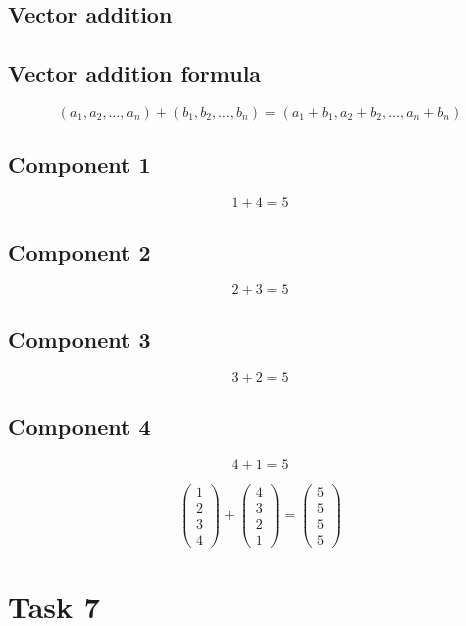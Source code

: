 \documentclass{article}
\begin{document}
\subsection*{Vector addition}
\subsection*{ \vspace{1em} Vector addition formula}
\[
(a_1, a_2, \dots, a_n) + (b_1, b_2, \dots, b_n) = (a_1 + b_1, a_2 + b_2, \dots, a_n + b_n)
\]
\subsection*{ \vspace{1em} Component 1}
\[
1 + 4 = 5
\]
\subsection*{ \vspace{1em} Component 2}
\[
2 + 3 = 5
\]
\subsection*{ \vspace{1em} Component 3}
\[
3 + 2 = 5
\]
\subsection*{ \vspace{1em} Component 4}
\[
4 + 1 = 5
\]
\medskip

\[
\begin{pmatrix}1 \\ 2 \\ 3 \\ 4\end{pmatrix} + \begin{pmatrix}4 \\ 3 \\ 2 \\ 1\end{pmatrix} = \begin{pmatrix}5 \\ 5 \\ 5 \\ 5\end{pmatrix}
\]
\bigskip

\hrulefill
\bigskip

\section*{Task 7}
\end{document}
